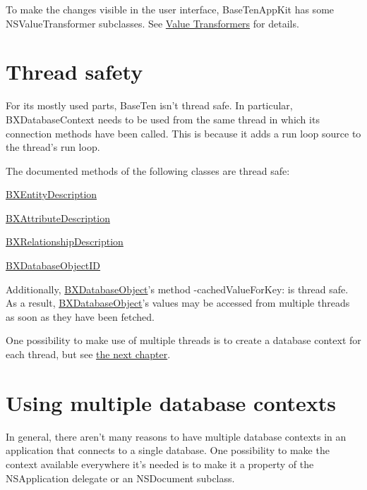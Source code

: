 To make the changes visible in the user interface, Base\+Ten\+App\+Kit has some N\+S\+Value\+Transformer subclasses. See \hyperlink{group__value__transformers}{Value Transformers} for details. \hypertarget{thread_safety}{}\section{Thread safety}\label{thread_safety}
For its mostly used parts, Base\+Ten isn't thread safe. In particular, B\+X\+Database\+Context needs to be used from the same thread in which its connection methods have been called. This is because it adds a run loop source to the thread's run loop.

The documented methods of the following classes are thread safe\+:

\begin{DoxyItemize}
\item \hyperlink{interface_b_x_entity_description}{B\+X\+Entity\+Description} \item \hyperlink{interface_b_x_attribute_description}{B\+X\+Attribute\+Description} \item \hyperlink{interface_b_x_relationship_description}{B\+X\+Relationship\+Description} \item \hyperlink{interface_b_x_database_object_i_d}{B\+X\+Database\+Object\+I\+D}\end{DoxyItemize}
Additionally, \hyperlink{interface_b_x_database_object}{B\+X\+Database\+Object}'s method -\/cached\+Value\+For\+Key\+: is thread safe. As a result, \hyperlink{interface_b_x_database_object}{B\+X\+Database\+Object}'s values may be accessed from multiple threads as soon as they have been fetched.

One possibility to make use of multiple threads is to create a database context for each thread, but see \hyperlink{multiple_contexts}{the next chapter}. \hypertarget{multiple_contexts}{}\section{Using multiple database contexts}\label{multiple_contexts}
In general, there aren't many reasons to have multiple database contexts in an application that connects to a single database. One possibility to make the context available everywhere it's needed is to make it a property of the N\+S\+Application delegate or an N\+S\+Document subclass.

